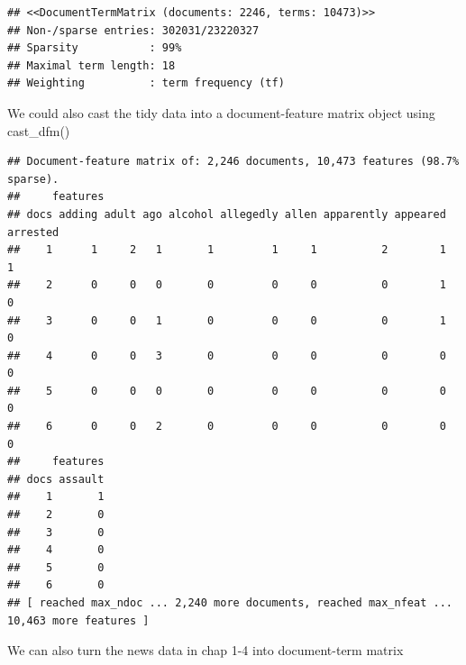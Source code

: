 \documentclass[]{article}
\newenvironment{Shaded}{\begin{snugshade}}{\end{snugshade}}
\newcommand{\KeywordTok}[1]{\textcolor[rgb]{0.13,0.29,0.53}{\textbf{#1}}}
\newcommand{\NormalTok}[1]{#1}
\newcommand{\OperatorTok}[1]{\textcolor[rgb]{0.81,0.36,0.00}{\textbf{#1}}}
\newcommand{\StringTok}[1]{\textcolor[rgb]{0.31,0.60,0.02}{#1}}
\begin{document}
\begin{verbatim}
## <<DocumentTermMatrix (documents: 2246, terms: 10473)>>
## Non-/sparse entries: 302031/23220327
## Sparsity           : 99%
## Maximal term length: 18
## Weighting          : term frequency (tf)
\end{verbatim}

We could also cast the tidy data into a document-feature matrix object
using cast\_dfm()

\begin{Shaded}
\end{Shaded}

\begin{verbatim}
## Document-feature matrix of: 2,246 documents, 10,473 features (98.7% sparse).
##     features
## docs adding adult ago alcohol allegedly allen apparently appeared arrested
##    1      1     2   1       1         1     1          2        1        1
##    2      0     0   0       0         0     0          0        1        0
##    3      0     0   1       0         0     0          0        1        0
##    4      0     0   3       0         0     0          0        0        0
##    5      0     0   0       0         0     0          0        0        0
##    6      0     0   2       0         0     0          0        0        0
##     features
## docs assault
##    1       1
##    2       0
##    3       0
##    4       0
##    5       0
##    6       0
## [ reached max_ndoc ... 2,240 more documents, reached max_nfeat ... 10,463 more features ]
\end{verbatim}

We can also turn the news data in chap 1-4 into document-term matrix
\end{document}
